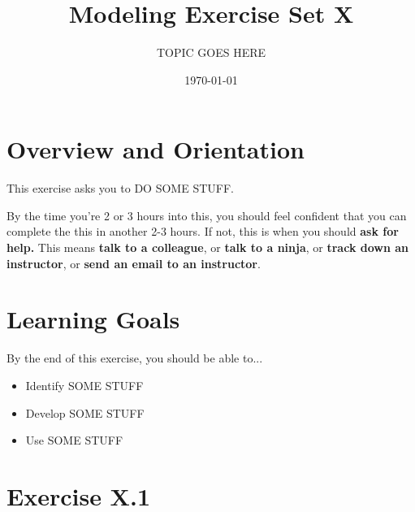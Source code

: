 \documentclass{tufte-handout}
\title{Modeling Exercise Set X}
\author{TOPIC GOES HERE}
\date{\today}
\begin{document}
\maketitle

\vspace{0.1in}
\section{Overview and Orientation}
This exercise asks you to DO SOME STUFF.

  By the time you're 2 or 3 hours into this, you should feel confident that you can complete the  this in another 2-3 hours.  If not, this is when you should {\bf ask for help.} This means {\bf talk to a colleague}, or {\bf talk to a ninja}, or {\bf track down an instructor}, or {\bf send an email to an instructor}.
\section{Learning Goals}
By the end of this exercise, you should be able to...
\begin{itemize}
\item Identify SOME STUFF
\item Develop SOME STUFF
\item Use SOME STUFF
\end{itemize}

\pagebreak

\section*{Exercise X.1}


\end{document}
